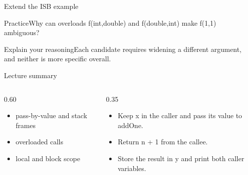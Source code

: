 \documentclass[10pt,aspectratio=169]{beamer}
\begin{document}
\begin{frame}[fragile,t]{Extend the ISB example}
\begin{alertblock}{Practice}Why can overloads f(int,double) and f(double,int) make f(1,1) ambiguous?\end{alertblock}\vspace{3mm}\begin{exampleblock}{Explain your reasoning}Each candidate requires widening a different argument, and neither is more specific overall.\end{exampleblock}
\end{frame}
\begin{frame}[fragile,t]{Lecture summary}
\begin{columns}[T,onlytextwidth]\begin{column}{0.60\textwidth}
\begin{itemize}
\item pass-by-value and stack frames
\item overloaded calls
\item local and block scope
\end{itemize}
\end{column}\begin{column}{0.35\textwidth}\small
\begin{itemize}
\item Keep x in the caller and pass its value to addOne.
\item Return n + 1 from the callee.
\item Store the result in y and print both caller variables.
\end{itemize}
\end{column}\end{columns}
\end{frame}
\end{document}
